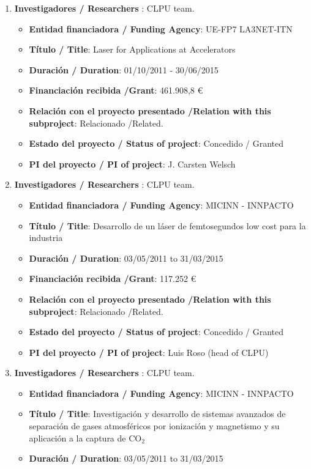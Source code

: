 \begin{enumerate}
\item {\bf Investigadores / Researchers }: CLPU team.
\begin{itemize}
\item {\bf Entidad financiadora / Funding Agency}: UE-FP7 LA3NET-ITN  
\item {\bf Título / Title}:  Laser for Applications at Accelerators
\item {\bf Duración / Duration}: 01/10/2011 - 30/06/2015 
\item {\bf Financiación recibida /Grant}: 461.908,8 \euro  
\item {\bf Relación con el proyecto presentado /Relation with this subproject}: Relacionado /Related. 
\item {\bf Estado del proyecto / Status of project}: Concedido / Granted
\item {\bf PI del proyecto / PI of project}: J. Carsten Welsch
\end{itemize}
\item {\bf Investigadores / Researchers }: CLPU team.
\begin{itemize}
\item {\bf Entidad financiadora / Funding Agency}: MICINN - INNPACTO  
\item {\bf Título / Title}:  Desarrollo de un l\'aser de femtosegundos low cost para la industria
\item {\bf Duración / Duration}: 03/05/2011 to 31/03/2015 
\item {\bf Financiación recibida /Grant}: 117.252 \euro  
\item {\bf Relación con el proyecto presentado /Relation with this subproject}: Relacionado /Related. 
\item {\bf Estado del proyecto / Status of project}: Concedido / Granted
\item {\bf PI del proyecto / PI of project}: Luis Roso (head of CLPU)
\end{itemize}
\item {\bf Investigadores / Researchers }: CLPU team.
\begin{itemize}
\item {\bf Entidad financiadora / Funding Agency}: MICINN - INNPACTO  
\item {\bf Título / Title}:  Investigaci\'on y desarrollo de sistemas avanzados de separaci\'on de gases atmosf\'ericos por ionizaci\'on y magnetismo y su aplicaci\'on a la captura de CO$_2$
\item {\bf Duración / Duration}: 03/05/2011 to 31/03/2015

\end{itemize}
\end{enumerate}
